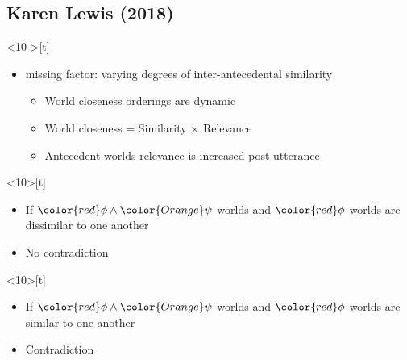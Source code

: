 \subsection*{Karen Lewis (2018)}
\begin{frame}<10->[t]
	\subsectionpage	\vskip 9pt
	\begin{itemize}
		\item<1->	 missing factor: varying degrees of inter-antecedental similarity\vskip 18pt
		    \begin{itemize}
		        \item<3-> World closeness orderings are dynamic \citep{Lewis2016}\vskip 9pt
		        \item<4-> World closeness = Similarity $\times$ Relevance \citep{Lewis2016}\vskip 9pt
		        \item<5-> Antecedent worlds relevance is increased post-utterance \citep{Lewis2017}
		    \end{itemize}\vskip 18pt
	\end{itemize}
\end{frame}

\begin{frame}<10>[t]
\subsectionpage\vskip 9pt
\begin{itemize}
    \item If ${\color{red}\phi}\land{\color{Orange}\psi}$-worlds and $\color{red}\phi$-worlds are dissimilar to one another
\end{itemize}\vskip 9pt
\begin{figure}[ht!]
\centering
\resizebox{!}{175pt}{}
\end{figure}
\begin{itemize}
    \item No contradiction
\end{itemize}
\end{frame}

\begin{frame}<10>[t]
\subsectionpage\vskip 9pt
\begin{itemize}
    \item If ${\color{red}\phi}\land{\color{Orange}\psi}$-worlds and $\color{red}\phi$-worlds are similar to one another
\end{itemize}\vskip 9pt
\begin{figure}[ht!]
\centering
\resizebox{!}{175pt}{}
\end{figure}
\begin{itemize}
    \item Contradiction
\end{itemize}
\end{frame}


